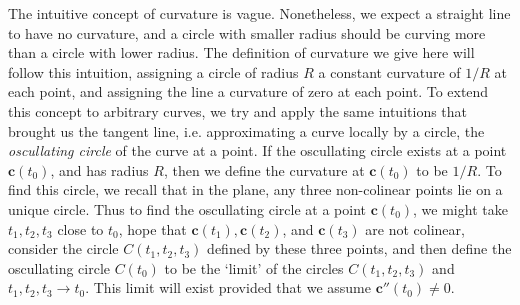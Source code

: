 The intuitive concept of curvature is vague. Nonetheless, we expect a straight line to have no curvature, and a circle with smaller radius should be curving more than a circle with lower radius. The definition of curvature we give here will follow this intuition, assigning a circle of radius $R$ a constant curvature of $1/R$ at each point, and assigning the line a curvature of zero at each point. To extend this concept to arbitrary curves, we try and apply the same intuitions that brought us the tangent line, i.e. approximating a curve locally by a circle, the \emph{oscullating circle} of the curve at a point. If the oscullating circle exists at a point $\mathbf{c}(t_0)$, and has radius $R$, then we define the curvature at $\mathbf{c}(t_0)$ to be $1/R$. To find this circle, we recall that in the plane, any three non-colinear points lie on a unique circle. Thus to find the oscullating circle at a point $\mathbf{c}(t_0)$, we might take $t_1,t_2,t_3$ close to $t_0$, hope that $\mathbf{c}(t_1), \mathbf{c}(t_2)$, and $\mathbf{c}(t_3)$ are not colinear, consider the circle $C(t_1,t_2,t_3)$ defined by these three points, and then define the oscullating circle $C(t_0)$ to be the `limit' of the circles $C(t_1,t_2,t_3)$ and $t_1,t_2,t_3 \to t_0$. This limit will exist provided that we assume $\mathbf{c}''(t_0) \neq 0$.

